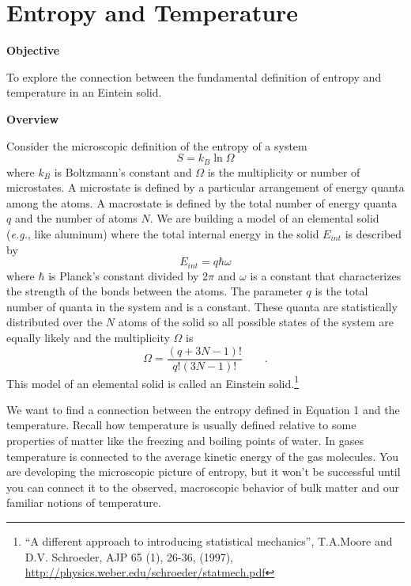\section{Entropy and Temperature}

\makelabheader %

\textbf{Objective}

To explore the connection between the fundamental definition of entropy and
temperature in an Eintein solid.

\textbf{Overview}

Consider the microscopic  definition of the entropy of a system
\begin{equation}
S = k_B \ln \Omega
\end{equation}
where $k_B$ is Boltzmann's constant and $\Omega$ is the multiplicity or number of 
microstates.
A microstate is defined by a particular arrangement of energy quanta among the
atoms.
A macrostate is defined by the total number of energy quanta $q$ and the number of atoms $N$.
We are building a model of an elemental solid ({\it e.g.}, like aluminum)
where
the total internal energy in the solid $E_{int}$ is described by
\begin{equation}
E_{int} = q \hbar \omega 
\end{equation}
where $\hbar$ is Planck's constant divided by $2\pi$ and $\omega$ is a constant that
characterizes the strength of the bonds between the atoms.
The parameter 
$q$ is the total number of quanta in the system and is a constant.
These quanta are statistically distributed over the $N$ atoms of the solid so
all possible states of the system are equally likely and the multiplicity $\Omega$
is
\begin{equation}
\Omega = \frac{(q+3N-1)!}{q!(3N-1)!} \qquad .
\end{equation}
This model of an elemental solid is called an Einstein solid.\footnote{``A different approach to introducing statistical mechanics'', T.A.Moore and D.V. Schroeder,
AJP 65 (1), 26-36, (1997), 
\url{http://physics.weber.edu/schroeder/statmech.pdf}} %

We want to find a connection between the entropy defined in Equation 1 and the
temperature.
Recall how temperature is usually defined
relative to some properties of matter like the freezing and 
boiling points of water.
In gases temperature is connected to the average kinetic energy of the gas molecules.
You are developing the microscopic picture of entropy, but it won't be successful until
you can connect it to the observed, macroscopic behavior of bulk matter and our familiar notions of 
temperature.

